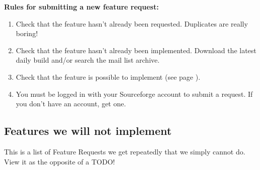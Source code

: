 {\bfseries
Rules for submitting a new feature request:}

\begin{enumerate}
\item Check that the feature hasn't already been
requested. Duplicates are really boring!
\item Check that the feature hasn't already been
implemented. Download the latest daily build and/or search the mail
list archive.
\item Check that the feature is possible to implement (see page
\pageref{ref:NODO}).
\item You must be logged in with your Sourceforge account to submit a
request. If you don't have an account, get one. 
\end{enumerate}


\subsection{\label{ref:NODO}Features we will not implement}
This is a list of Feature Requests we get repeatedly that we simply
cannot do. View it as the opposite of a TODO!


